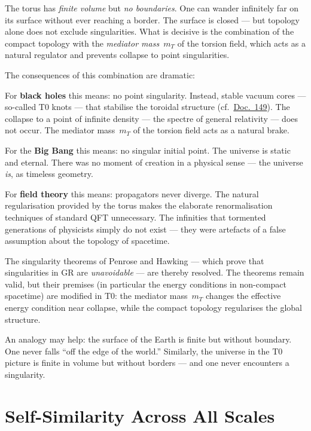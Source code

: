 The torus has \emph{finite volume} but \emph{no boundaries}. One can wander infinitely far on its surface without ever reaching a border. The surface is closed --- but topology alone does not exclude singularities. What is decisive is the combination of the compact topology with the \emph{mediator mass~$m_T$} of the torsion field, which acts as a natural regulator and prevents collapse to point singularities.

The consequences of this combination are dramatic:

For \textbf{black holes} this means: no point singularity. Instead, stable vacuum cores --- so-called T0 knots --- that stabilise the toroidal structure (cf.\ \href{https://github.com/jpascher/T0-Time-Mass-Duality/blob/main/2/pdf/149_FFGFT-torsion_De.pdf}{Doc.~149}). The collapse to a point of infinite density --- the spectre of general relativity --- does not occur. The mediator mass~$m_T$ of the torsion field acts as a natural brake.

For the \textbf{Big Bang} this means: no singular initial point. The universe is static and eternal. There was no moment of creation in a physical sense --- the universe \emph{is}, as timeless geometry.

For \textbf{field theory} this means: propagators never diverge. The natural regularisation provided by the torus makes the elaborate renormalisation techniques of standard QFT unnecessary. The infinities that tormented generations of physicists simply do not exist --- they were artefacts of a false assumption about the topology of spacetime.

The singularity theorems of Penrose and Hawking --- which prove that singularities in GR are \emph{unavoidable} --- are thereby resolved. The theorems remain valid, but their premises (in particular the energy conditions in non-compact spacetime) are modified in T0: the mediator mass~$m_T$ changes the effective energy condition near collapse, while the compact topology regularises the global structure.

An analogy may help: the surface of the Earth is finite but without boundary. One never falls ``off the edge of the world.'' Similarly, the universe in the T0 picture is finite in volume but without borders --- and one never encounters a singularity.

\section{Self-Similarity Across All Scales}

